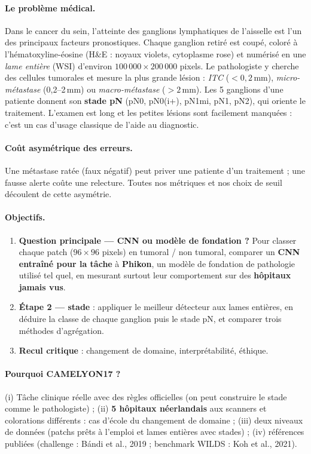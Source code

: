 \documentclass[11pt,a4paper]{article}
\begin{document}
\paragraph{Le problème médical.}
Dans le cancer du sein, l'atteinte des ganglions lymphatiques de l'aisselle est l'un des principaux facteurs pronostiques.
Chaque ganglion retiré est coupé, coloré à l'hématoxyline-éosine (H\&E : noyaux violets, cytoplasme rose) et numérisé en une
\emph{lame entière} (WSI) d'environ $100\,000\times200\,000$ pixels. Le pathologiste y cherche des cellules tumorales et mesure
la plus grande lésion : \emph{ITC} ($<0{,}2$\,mm), \emph{micro-métastase} (0,2–2\,mm) ou \emph{macro-métastase} ($>2$\,mm).
Les 5 ganglions d'une patiente donnent son \textbf{stade pN} (pN0, pN0(i+), pN1mi, pN1, pN2), qui oriente le traitement.
L'examen est long et les petites lésions sont facilement manquées : c'est un cas d'usage classique de l'aide au diagnostic.

\paragraph{Coût asymétrique des erreurs.} Une métastase ratée (faux négatif) peut priver une patiente d'un traitement ; une fausse
alerte coûte une relecture. Toutes nos métriques et nos choix de seuil découlent de cette asymétrie.

\paragraph{Objectifs.}
\begin{enumerate}
  \item \textbf{Question principale — CNN ou modèle de fondation ?} Pour classer chaque patch ($96\times96$ pixels) en tumoral /
        non tumoral, comparer un \textbf{CNN entraîné pour la tâche} à \textbf{Phikon}, un modèle de fondation de pathologie
        utilisé tel quel, en mesurant surtout leur comportement sur des \textbf{hôpitaux jamais vus}.
  \item \textbf{Étape 2 — stade} : appliquer le meilleur détecteur aux lames entières, en déduire la classe de chaque ganglion
        puis le stade pN, et comparer trois méthodes d'agrégation.
  \item \textbf{Recul critique} : changement de domaine, interprétabilité, éthique.
\end{enumerate}

\paragraph{Pourquoi CAMELYON17 ?} (i) Tâche clinique réelle avec des règles officielles (on peut construire le stade comme le
pathologiste) ; (ii) \textbf{5 hôpitaux néerlandais} aux scanners et colorations différents : cas d'école du changement de
domaine ; (iii) deux niveaux de données (patchs prêts à l'emploi et lames entières avec stades) ; (iv) références publiées
(challenge : Bándi et al., 2019 ; benchmark WILDS : Koh et al., 2021).
\end{document}
